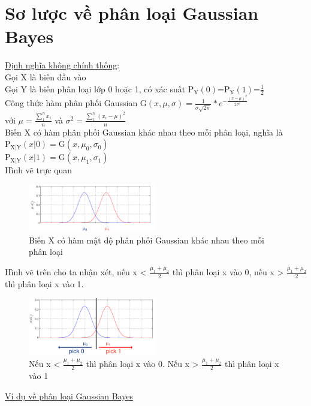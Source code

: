 \documentclass[a4paper, 13pt]{report}
\begin{document}
\section{Sơ lược về phân loại Gaussian Bayes}
\underline{Định nghĩa không chính thống}:\\
Gọi X là biến đầu vào\\
Gọi Y là biến phân loại lớp 0 hoặc 1, có xác suất $\mathrm{P_Y}(0)$=$\mathrm{P_Y}(1)$=$\frac{1}{2}$\\
Công thức hàm phân phối Gaussian 
$
\mathrm{G}(x,\mu,\sigma)=\frac{1}{\sigma\sqrt{2\pi}} * e^{-\frac{(x-\mu)^2}{2\sigma^2}}  
$\\
với $\mu=\frac{\sum_1^n x_i}{n}$ và $\sigma^2=\frac{\sum_1^n (x_i-\mu)^2}{n}$\\
Biến X có hàm phân phối Gaussian khác nhau theo mỗi phân loại, nghĩa là \\
$\mathrm{P_{X|Y}}(x|0)=\mathrm{G}(x,\mu_0,\sigma_0)$\\
$\mathrm{P_{X|Y}}(x|1)=\mathrm{G}(x,\mu_1,\sigma_1)$\\
Hình vẽ trực quan\\  
\FloatBarrier
\begin{figure}[h]
  \centering
    \includegraphics[width=0.5\textwidth]{GaussBayesEx.png}    
    \caption{Biến X có hàm mật độ phân phối Gaussian khác nhau theo mỗi phân loại}
\end{figure}
\FloatBarrier 
Hình vẽ trên cho ta nhận xét, nếu x < $\frac{\mu_1+\mu_2}{2}$ thì phân loại x vào 0, nếu x > $\frac{\mu_1+\mu_2}{2}$ thì phân loại x vào 1.\\  
\FloatBarrier
\begin{figure}[h]
  \centering
    \includegraphics[width=0.5\textwidth]{GaussBayesEx2.png}
	\caption{Nếu x < $\frac{\mu_1+\mu_2}{2}$ thì phân loại x vào 0. Nếu x > $\frac{\mu_1+\mu_2}{2}$ thì phân loại x vào 1}
\end{figure}
\FloatBarrier 
\underline{Ví dụ về phân loại Gaussian Bayes}\\
\end{document}

